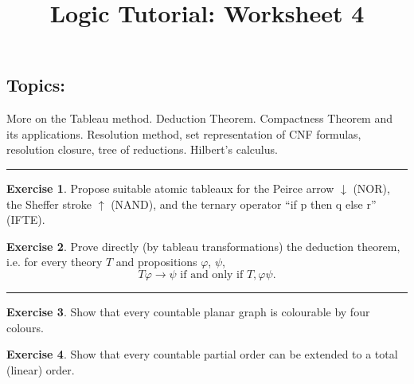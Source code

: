 \documentclass{amsart}
\title{\sc Logic Tutorial: Worksheet 4}
\date{}
\theoremstyle{definition}
\newtheorem{problem}{Exercise}
\begin{document}
\maketitle


\subsection*{Topics:} More on the Tableau method. Deduction Theorem. Compactness Theorem and its applications. Resolution method, set representation of CNF formulas, resolution closure, tree of reductions. Hilbert's calculus.

\medskip \hrule

\begin{problem} Propose suitable atomic tableaux for the Peirce arrow $\downarrow$ (NOR), the Sheffer stroke $\uparrow$ (NAND), and the ternary operator ``if p then q else r'' (IFTE).
\end{problem}\medskip

\begin{problem}
Prove directly (by tableau transformations) the deduction theorem, i.e. for every theory $T$ and propositions $\varphi$, $\psi$,
$$T  \varphi\to \psi\text{\ \ if and only if\ \ }T,\varphi  \psi.$$
\end{problem}\medskip


\hrule

\begin{problem}
Show that every countable planar graph is colourable by four colours.
\end{problem}\medskip

\begin{problem}
Show that every countable partial order can be extended to a total (linear) order.
\end{problem}\medskip

\end{document}
